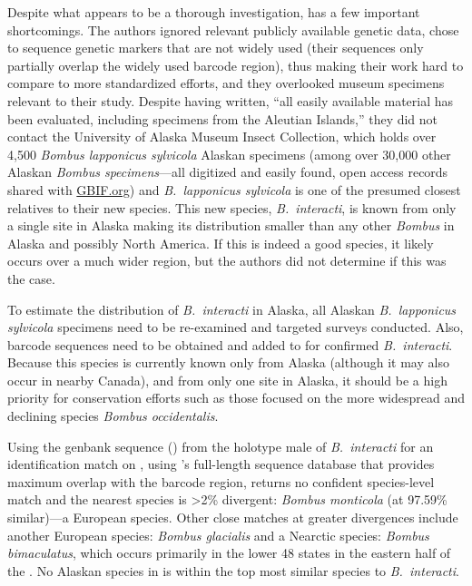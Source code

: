\begin{multicols}{2}
Despite what appears to be a thorough investigation, \citet{Martinetetal2019} has a few important shortcomings. The authors ignored relevant publicly available genetic data, chose to sequence genetic markers that are not widely used (their  sequences only partially overlap the widely used  barcode region), thus making their work hard to compare to more standardized efforts, and they overlooked museum specimens relevant to their study. Despite having written, “all easily available material has been evaluated, including specimens from the Aleutian Islands,” \citep{Martinetetal2019} they did not contact the University of Alaska Museum Insect Collection, which holds over 4,500 \textit{Bombus lapponicus sylvicola} Alaskan specimens (among over 30,000 other Alaskan \textit{Bombus specimens}---all digitized and easily found, open access records shared with \href{https://www.gbif.org/}{GBIF.org}) and \textit{B.\ lapponicus sylvicola} is one of the presumed closest relatives to their new species. This new species, \textit{B.\ interacti}, is known from only a single site in Alaska making its distribution smaller than any other \textit{Bombus} in Alaska and possibly North America. If this is indeed a good species, it likely occurs over a much wider region, but the authors did not determine if this was the case. 

To estimate the distribution of \textit{B.\ interacti} in Alaska, all Alaskan \textit{B.\ lapponicus sylvicola} specimens need to be re-examined and targeted surveys conducted. Also,  barcode sequences need to be obtained and added to  for confirmed \textit{B.\ interacti}. Because this species is currently known only from Alaska (although it may also occur in nearby Canada), and from only one site in Alaska, it should be a high priority for conservation efforts such as those focused on the more widespread and declining species \textit{Bombus occidentalis}. 

Using the genbank  sequence () from the holotype male of \textit{B.\ interacti} for an identification match on , using ’s full-length sequence database that provides maximum overlap with the  barcode region, returns no confident species-level match and the nearest species is >2\% divergent: \textit{Bombus monticola} (at 97.59\% similar)---a European species. Other close matches at greater divergences include another European species: \textit{Bombus glacialis} and a Nearctic species: \textit{Bombus bimaculatus}, which occurs primarily in the lower 48  states in the eastern half of the . No Alaskan species in  is within the top most similar species to \textit{B.\ interacti}.


\end{multicols}
